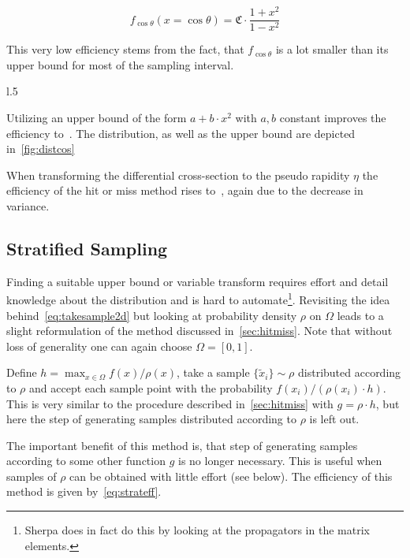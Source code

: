\begin{equation}
  \label{eq:distcos}
  f_{\cos\theta}(x=\cos\theta) = \mathfrak{C}\cdot\frac{1+x^2}{1-x^2}
\end{equation}

This very low efficiency stems from the fact, that \(f_{\cos\theta}\)
is a lot smaller than its upper bound for most of the sampling
interval.

\begin{wrapfigure}[15]{l}{.5\textwidth}
  \caption{\label{fig:distcos} The distribution~\eqref{eq:distcos} and an upper bound of
    the form \(a + b\cdot x^2\).}
\end{wrapfigure}

Utilizing an upper bound of the form \(a + b\cdot x^2\) with \(a, b\)
constant improves the efficiency
to~. The distribution, as well as the
upper bound are depicted in~\ref{fig:distcos}

When transforming the differential cross-section to the pseudo
rapidity \(\eta\) the efficiency of the hit or miss method rises
to~, again due to the decrease in variance.

\subsection{Stratified Sampling}%
\label{sec:stratsamp}
Finding a suitable upper bound or variable transform requires effort
and detail knowledge about the distribution and is hard to
automate\footnote{Sherpa does in fact do this by looking at the
  propagators in the matrix elements.}.  Revisiting the idea
behind~\eqref{eq:takesample2d} but looking at probability density
\(\rho\) on \(\Omega\) leads to a slight reformulation of the method
discussed in~\ref{sec:hitmiss}. Note that without loss of generality
one can again choose \(\Omega = [0, 1]\).

Define \(h=\max_{x\in\Omega}f(x)/\rho(x)\), take a sample
\(\{\tilde{x}_i\}\sim\rho\) distributed according to \(\rho\) and
accept each sample point with the probability
\(f(x_i)/(\rho(x_i)\cdot h)\).  This is very similar to the procedure
described in~\ref{sec:hitmiss} with \(g=\rho\cdot h\), but here the
step of generating samples distributed according to \(\rho\) is left
out.

The important benefit of this method is, that step of generating
samples according to some other function \(g\) is no longer
necessary. This is useful when samples of \(\rho\) can be obtained
with little effort (see below). The efficiency of this method is given
by~\eqref{eq:strateff}.

